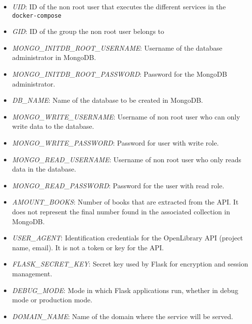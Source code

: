 \documentclass[12pt,a4paper]{article}
\begin{document}
{{            \begin{itemize}[label=$\bullet$]
                \item \emph{UID}: ID of the non root user that executes the different services in the \verb*|docker-compose|
                \item \emph{GID}: ID of the group the non root user belongs to
                
                \item \emph{MONGO\_INITDB\_ROOT\_USERNAME}: Username of the database administrator in MongoDB.
                \item \emph{MONGO\_INITDB\_ROOT\_PASSWORD}: Password for the MongoDB administrator.
                
                \item \emph{DB\_NAME}: Name of the database to be created in MongoDB.
                
                \item \emph{MONGO\_WRITE\_USERNAME}: Username of non root user who can only write data to the database.
                \item \emph{MONGO\_WRITE\_PASSWORD}: Password for user with write role.
                \item \emph{MONGO\_READ\_USERNAME}: Username of non root user who only reads data in the database.
                \item \emph{MONGO\_READ\_PASSWORD}: Password for the user with read role.
                
                \item \emph{AMOUNT\_BOOKS}: Number of books that are extracted from the API. It does not represent the final number found in the associated collection in MongoDB.
                \item \emph{USER\_AGENT}: Identification credentials for the OpenLibrary API (project name, email). It is not a token or key for the API.
                
                \item \emph{FLASK\_SECRET\_KEY}: Secret key used by Flask for encryption and session management.
                \item \emph{DEBUG\_MODE}: Mode in which Flask applications run, whether in debug mode or production mode.
                
                \item \emph{DOMAIN\_NAME}: Name of the domain where the service will be served.
        

\end{itemize}}}
\end{document}
